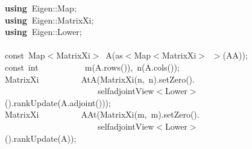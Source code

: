 \documentclass[shortnames,article]{jss}
\newcommand{\hlstd}[1]{\textcolor[rgb]{0,0,0}{#1}}
\newcommand{\hlopt}[1]{\textcolor[rgb]{0,0,0}{#1}}
\newcommand{\hlkwa}[1]{\textcolor[rgb]{0.61,0.13,0.93}{\bf{#1}}}
\newcommand{\hlkwb}[1]{\textcolor[rgb]{0.13,0.54,0.13}{#1}}
\newcommand{\hlkwd}[1]{\textcolor[rgb]{0,0,0}{#1}}
\begin{document}
\begin{figure}[htb]
    \noindent
    \ttfamily
    \hlstd{}\hlkwa{using\ }\hlstd{Eigen}\hlopt{::}\hlstd{Map}\hlopt{;}\hspace*{\fill}\\
    \hlstd{}\hlkwa{using\ }\hlstd{Eigen}\hlopt{::}\hlstd{MatrixXi}\hlopt{;}\hspace*{\fill}\\
    \hlstd{}\hlkwa{using\ }\hlstd{Eigen}\hlopt{::}\hlstd{Lower}\hlopt{;}\hspace*{\fill}\\
    \hlstd{}\hspace*{\fill}\\
    \hlkwb{const\ }\hlstd{Map}\hlopt{$<$}\hlstd{MatrixXi}\hlopt{$>$\ }\hlstd{}\hlkwd{A}\hlstd{}\hlopt{(}\hlstd{as}\hlopt{$<$}\hlstd{Map}\hlopt{$<$}\hlstd{MatrixXi}\hlopt{$>$\ $>$(}\hlstd{AA}\hlopt{));}\hspace*{\fill}\\
    \hlstd{}\hlkwb{const\ int}\hlstd{\ \ \ \ \ \ \ \ \ \ \ }\hlkwb{}\hlstd{}\hlkwd{m}\hlstd{}\hlopt{(}\hlstd{A}\hlopt{.}\hlstd{}\hlkwd{rows}\hlstd{}\hlopt{()),\ }\hlstd{}\hlkwd{n}\hlstd{}\hlopt{(}\hlstd{A}\hlopt{.}\hlstd{}\hlkwd{cols}\hlstd{}\hlopt{());}\hspace*{\fill}\\
    \hlstd{MatrixXi}\hlstd{\ \ \ \ \ \ \ \ \ \ }\hlstd{}\hlkwd{AtA}\hlstd{}\hlopt{(}\hlstd{}\hlkwd{MatrixXi}\hlstd{}\hlopt{(}\hlstd{n}\hlopt{,\ }\hlstd{n}\hlopt{).}\hlstd{}\hlkwd{setZero}\hlstd{}\hlopt{().}\hspace*{\fill}\\
    \hlstd{}\hlstd{\ \ \ \ \ \ \ \ \ \ \ \ \ \ \ \ \ \ \ \ \ \ }\hlstd{selfadjointView}\hlopt{$<$}\hlstd{Lower}\hlopt{$>$().}\hlstd{}\hlkwd{rankUpdate}\hlstd{}\hlopt{(}\hlstd{A}\hlopt{.}\hlstd{}\hlkwd{adjoint}\hlstd{}\hlopt{()));}\hspace*{\fill}\\
    \hlstd{MatrixXi}\hlstd{\ \ \ \ \ \ \ \ \ \ }\hlstd{}\hlkwd{AAt}\hlstd{}\hlopt{(}\hlstd{}\hlkwd{MatrixXi}\hlstd{}\hlopt{(}\hlstd{m}\hlopt{,\ }\hlstd{m}\hlopt{).}\hlstd{}\hlkwd{setZero}\hlstd{}\hlopt{().}\hspace*{\fill}\\
    \hlstd{}\hlstd{\ \ \ \ \ \ \ \ \ \ \ \ \ \ \ \ \ \ \ \ \ \ }\hlstd{selfadjointView}\hlopt{$<$}\hlstd{Lower}\hlopt{$>$().}\hlstd{}\hlkwd{rankUpdate}\hlstd{}\hlopt{(}\hlstd{A}\hlopt{));}\hspace*{\fill}\\

\end{figure}
\end{document}
